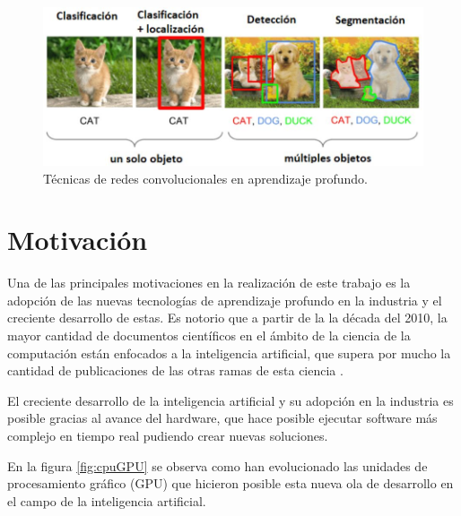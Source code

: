 \begin{figure}[ht]
	\centering
	\includegraphics[scale=.7]{./Figures/visionDeepLearning.jpg}
	\caption{Técnicas de redes convolucionales en aprendizaje profundo.}
	\label{fig:visionDeepLearning}
\end{figure}


\section{Motivación}
\label{sec:motivacion}

Una de las principales motivaciones en la realización de este trabajo es la adopción de las nuevas tecnologías de aprendizaje profundo en la industria y el  creciente desarrollo de estas. Es notorio que a partir de la la década del 2010, la mayor cantidad de documentos científicos en el ámbito de la ciencia de la computación están enfocados a la inteligencia artificial, que supera por mucho la cantidad de publicaciones de las otras ramas de esta ciencia \citep{AI_PAPERS}.

El creciente desarrollo de la inteligencia artificial y su adopción en la industria es posible gracias al avance del hardware, que hace posible ejecutar software más complejo en tiempo real pudiendo crear nuevas soluciones.

\newpage

En la figura \ref{fig:cpuGPU} se observa como han evolucionado las unidades de procesamiento gráfico (GPU) que hicieron posible esta nueva ola de desarrollo en el campo de la inteligencia artificial.

